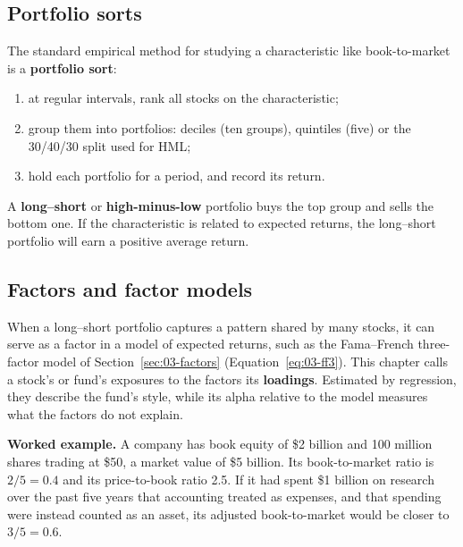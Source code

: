 \subsection{Portfolio sorts}

The standard empirical method for studying a characteristic like book-to-market is a \textbf{portfolio sort}:

\begin{enumerate}
  \item at regular intervals, rank all stocks on the characteristic;
  \item group them into portfolios: deciles (ten groups), quintiles (five) or the 30/40/30 split used for HML;
  \item hold each portfolio for a period, and record its return.
\end{enumerate}

A \textbf{long--short} or \textbf{high-minus-low} portfolio buys the top group and sells the bottom one. If the characteristic is related to expected returns, the long--short portfolio will earn a positive average return.

\subsection{Factors and factor models}

When a long--short portfolio captures a pattern shared by many stocks, it can serve as a factor in a model of expected returns, such as the Fama--French three-factor model of Section~\ref{sec:03-factors} (Equation~\eqref{eq:03-ff3}). This chapter calls a stock's or fund's exposures to the factors its \textbf{loadings}. Estimated by regression, they describe the fund's style, while its alpha relative to the model measures what the factors do not explain.

\textbf{Worked example.} A company has book equity of \$2 billion and 100 million shares trading at \$50, a market value of \$5 billion. Its book-to-market ratio is $2/5 = 0.4$ and its price-to-book ratio 2.5. If it had spent \$1 billion on research over the past five years that accounting treated as expenses, and that spending were instead counted as an asset, its adjusted book-to-market would be closer to $3/5 = 0.6$.


